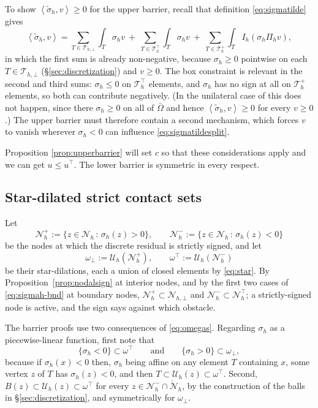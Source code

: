 \documentclass[12pt]{amsart}
\theoremstyle{definition}
\newcommand{\Om}{\Omega}
\newcommand{\Th}{\mathcal{T}_h}
\newcommand{\Nh}{\mathcal{N}_h}
\newcommand{\Nhr}{\mathring{\mathcal{N}}_h}
\newcommand{\Ih}{I_h}
\newcommand{\Pih}{\Pi_h}
\newcommand{\Uh}{\mathcal{U}_h}
\newcommand{\Thbot}{\mathcal{T}_{h,\bot}}
\newcommand{\Thtop}{\Th^\top}
\newcommand{\Thplus}{\Th^+}
\newcommand{\Nhbot}{\mathcal{N}_{h,\bot}}
\newcommand{\Nhtop}{\Nh^\top}
\newcommand{\ombot}{\omega_\bot}
\newcommand{\omtop}{\omega^\top}
\begin{document}
To show $\left<\tilde\sigma_h,v\right> \ge 0$ for the upper barrier, recall that definition \eqref{eq:sigmatilde} gives
\begin{equation}
\label{eq:sigmatildesplit}
  \left<\tilde\sigma_h,v\right> = \sum_{T\in\Thbot}\int_T \sigma_h v \ +\ \sum_{T\in\Thtop}\int_T \sigma_h v \ +\ \sum_{T\in\Thplus}\int_T \Ih(\sigma_h \Pih v),
\end{equation}
in which the first sum is already non-negative, because $\sigma_h \ge 0$ pointwise on each $T \in \Thbot$ (\S \ref{sec:discretization}) and $v \ge 0$.  The box constraint is relevant in the second and third sums: $\sigma_h \le 0$ on $\Thtop$ elements, and $\sigma_h$ has no sign at all on $\Thplus$ elements, so both can contribute negatively.  (In the unilateral case of \cite{NSV03} this does not happen, since there $\sigma_h \ge 0$ on all of $\bar\Om$ and hence $\left<\tilde\sigma_h,v\right> \ge 0$ for every $v \ge 0$.)  The upper barrier must therefore contain a second mechanism, which forces $v$ to vanish wherever $\sigma_h < 0$ can influence \eqref{eq:sigmatildesplit}.

Proposition \ref{prop:upperbarrier} will set $c$ so that these considerations apply and we can get $u\le u^\top$.  The lower barrier is symmetric in every respect.


\subsection{Star-dilated strict contact sets}

Let
\begin{equation}
\label{eq:Nhpm}
  \Nh^+ := \{z \in \Nh \,:\, \sigma_h(z) > 0\}, \qquad
  \Nh^- := \{z \in \Nh \,:\, \sigma_h(z) < 0\}
\end{equation}
be the nodes at which the discrete residual is strictly signed, and let
\begin{equation}
\label{eq:omegas}
  \ombot := \Uh(\Nh^+), \qquad \omtop := \Uh(\Nh^-)
\end{equation}
be their star-dilations, each a union of closed elements by \eqref{eq:star}.  By Proposition~\ref{prop:nodalsign} at interior nodes, and by the first two cases of \eqref{eq:sigmah-bnd} at boundary nodes, $\Nh^+ \subset \Nhbot$ and $\Nh^- \subset \Nhtop$; a strictly-signed node is active, and the sign says against which obstacle.

The barrier proofs use two consequences of \eqref{eq:omegas}.  Regarding $\sigma_h$ as a piecewise-linear function, first note that
\begin{equation}
\label{eq:omegacontains}
  \{\sigma_h < 0\} \subset \omtop \qquad \text{and} \qquad \{\sigma_h > 0\} \subset \ombot,
\end{equation}
because if $\sigma_h(x) < 0$ then, $\sigma_h$ being affine on any element $T$ containing $x$, some vertex $z$ of $T$ has $\sigma_h(z) < 0$, and then $T \subset \Uh(z) \subset \omtop$.  Second, $B(z) \subset \Uh(z) \subset \omtop$ for every $z \in \Nh^- \cap \Nhr$, by the construction of the balls in \S \ref{sec:discretization}, and symmetrically for $\ombot$.
\end{document}
